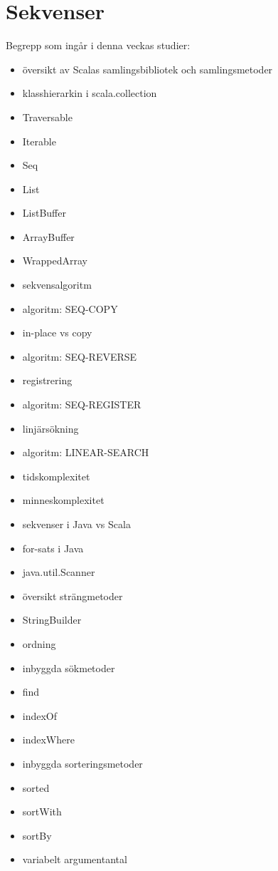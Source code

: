 \chapter{Sekvenser}\label{chapter:W06}
Begrepp som ingår i denna veckas studier:
\begin{multicols}{2}\begin{itemize}[noitemsep,label={$\square$},leftmargin=*]
\item översikt av Scalas samlingsbibliotek och samlingsmetoder
\item klasshierarkin i scala.collection
\item Traversable
\item Iterable
\item Seq
\item List
\item ListBuffer
\item ArrayBuffer
\item WrappedArray
\item sekvensalgoritm
\item algoritm: SEQ-COPY
\item in-place vs copy
\item algoritm: SEQ-REVERSE
\item registrering
\item algoritm: SEQ-REGISTER
\item linjärsökning
\item algoritm: LINEAR-SEARCH
\item tidskomplexitet
\item minneskomplexitet
\item sekvenser i Java vs Scala
\item for-sats i Java
\item java.util.Scanner
\item översikt strängmetoder
\item StringBuilder
\item ordning
\item inbyggda sökmetoder
\item find
\item indexOf
\item indexWhere
\item inbyggda sorteringsmetoder
\item sorted
\item sortWith
\item sortBy
\item variabelt argumentantal\end{itemize}\end{multicols}
